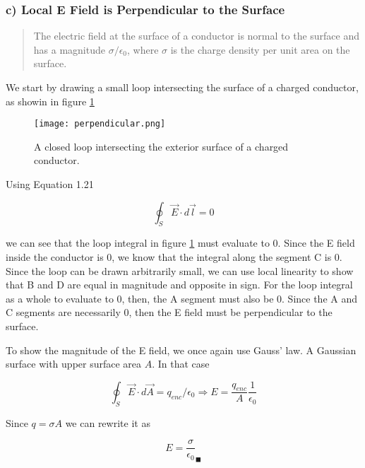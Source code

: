 \subsubsection*{c) Local E Field is Perpendicular to the Surface}

\begin{quote}
The electric field at the surface of a conductor is normal to the
surface and has a magnitude $\sigma / \epsilon_0$, where $\sigma$ is
the charge density per unit area on the surface.
\end{quote}

We start by drawing a small loop intersecting the surface of a charged
conductor, as showin in figure \ref{fig:1:1:loopy}

\begin{figure}
  \centering
  \texttt{[image: perpendicular.png]}
  \caption{A closed loop intersecting the exterior surface of a
    charged conductor.}
\label{fig:1:1:loopy}
\end{figure}

Using Equation 1.21

\begin{equation}
  \oint_S \vec{E} \cdot d\vec{l} = 0
\end{equation}

we can see that the loop integral in figure \ref{fig:1:1:loopy} must
evaluate to 0.  Since the E field inside the conductor is 0, we know
that the integral along the segment C is 0.  Since the loop can be
drawn arbitrarily small, we can use local linearity to show that B and
D are equal in magnitude and opposite in sign.  For the loop integral
as a whole to evaluate to 0, then, the A segment must also be 0.
Since the A and C segments are necessarily 0, then the E field must be
perpendicular to the surface.

To show the magnitude of the E field, we once again use Gauss' law.  A
Gaussian surface with upper surface area $A$.  In that case

\begin{equation}
  \oint_S{\vec{E} \cdot d\vec{A} = q_{enc} / \epsilon_0}
  \Rightarrow E = \frac{q_{enc}}{A} \frac{1}{\epsilon_0}
\end{equation}

Since $q = \sigma A$ we can rewrite it as

\begin{equation}
  E = \frac{\sigma}{\epsilon_0} _\blacksquare
\end{equation}
